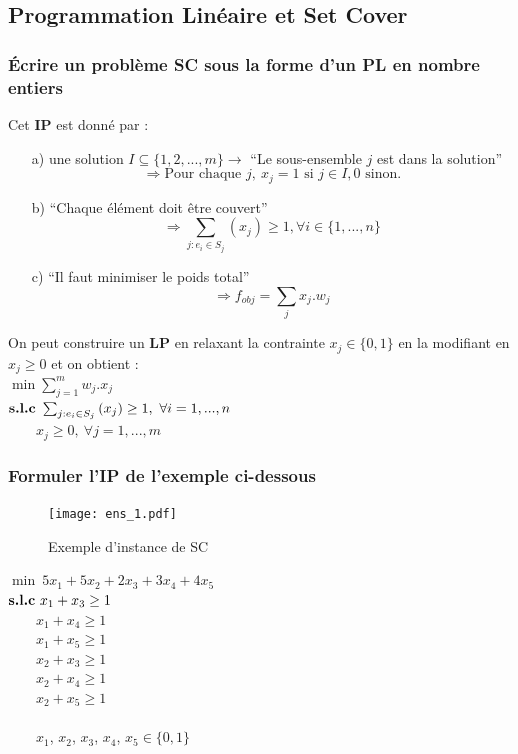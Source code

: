 \documentclass[12pt]{article}
\newcommand{\titre}[1]{\textcolor{title}{#1}}
\begin{document}
\subsection{Programmation Linéaire et Set Cover}

\subsubsection*{Écrire un problème \textbf{\titre{SC}} sous la forme d'un \textbf{\titre{PL}} en nombre entiers}

Cet \textbf{IP} est donné par :
\begin{enumerate}
\item[a)] une solution $I \subseteq \{ 1,2,...,m\} \rightarrow $ ``Le sous-ensemble $j$ est dans la solution'' \\
$$\Rightarrow \text{Pour chaque } j,\ x_j = 1 \text{ si } j \in I, 0 \text{ sinon}.$$
\item[b)] ``Chaque élément doit être couvert'' \\
$$\Rightarrow \sum_{j:e_i\in S_j}{(x_j) \geq 1}, \forall i \in \{1,...,n\}$$
\item[c)] ``Il faut minimiser le poids total''\\
$$\Rightarrow f_{obj} = \sum_j{x_j.w_j}$$
\end{enumerate}

On peut construire un \textbf{LP} en relaxant la contrainte $x_j \in \{0,1\}$ en la modifiant en $x_j \geq 0$ et on obtient : \\
$\min \sum_{j=1}^m{w_j.x_j}$ \\
\indent $\text{\textbf{s.l.c} } \sum_{j:e_i \in S_j}{(x_j)} \geq 1,\ \forall i = 1, ..., n$ \\
\indent $\qquad x_j \geq 0,\ \forall j = 1,...,m$

\subsubsection*{Formuler l'\titre{IP} de l'exemple ci-dessous}

\begin{figure}[H]
    \begin{center}
    \texttt{[image: ens\_1.pdf]}
    \caption{Exemple d'instance de \titre{SC}}
    \end{center}
\end{figure}

$\min\ 5x_1 + 5x_2 + 2x_3 + 3x_4 + 4x_5$\\
\indent $\text{\textbf{s.l.c} } x_1 + x_3 \geq 1$\\
\indent $\qquad x_1 + x_4 \geq 1$\\
\indent $\qquad x_1 + x_5 \geq 1$\\
\indent $\qquad x_2 + x_3 \geq 1$\\
\indent $\qquad x_2 + x_4 \geq 1$\\
\indent $\qquad x_2 + x_5 \geq 1$\\
$ $\\
\indent $\qquad x_1$, $x_2$, $x_3$, $x_4$, $x_5 \in \{0,1\}$
\end{document}
